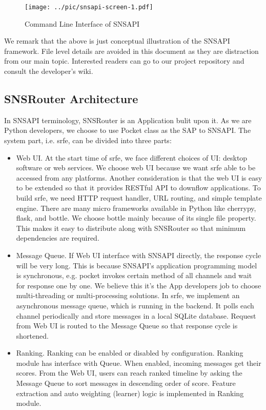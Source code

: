 \documentclass{sig-alternate}
\begin{document}
\begin{figure}[t!]
	\centering
	\texttt{[image: ../pic/snsapi-screen-1.pdf]}
	\caption{Command Line Interface of SNSAPI}
	\label{fig:snscli}
\end{figure}

We remark that the above is just conceptual illustration of the SNSAPI framework. 
File level details are avoided in this document as they are distraction from our main topic. 
Interested readers can go to our project repository \cite{github_snsapi} 
and consult the developer's wiki. 

\subsection{SNSRouter Architecture}
\label{sec:SNSRouter Architecture}

In SNSAPI terminology, SNSRouter is an Application bulit upon it. 
As we are Python developers, we choose to use Pocket class as the SAP to SNSAPI. 
The system part, i.e. \gls{srfe}, can be divided into three parts:
\begin{itemize}
	\item Web UI. 
		At the start time of \gls{srfe}, we face different choices of UI:
		desktop software or web services. 
		We choose web UI because we want \gls{srfe} able to be accessed from any platforms. 
		Another consideration is that the web UI is easy to be extended 
		so that it provides RESTful API to downflow applications. 
		To build \gls{srfe}, we need HTTP request handler, 
		URL routing, and simple template engine. 
		There are many micro frameworks available in Python like cherrypy, flask, and bottle. 
		We choose bottle mainly because of its single file property. 
		This makes it easy to distribute along with SNSRouter so that minimum dependencies are required. 
	\item Message Queue. 
		If Web UI interface with SNSAPI directly, the response cycle will be very long. 
		This is because SNSAPI's application programming model is synchronous, 
		e.g. pocket invokes certain method of all channels and wait for response one by one. 
		We believe this it's the App developers job to choose 
		multi-threading or multi-processing solutions. 
		In \gls{srfe}, we implement an asynchronous message queue, which is running in the backend. 
		It polls each channel periodically and store messages in a local SQLite database. 
		Request from Web UI is routed to the Message Queue so that response cycle is shortened. 
	\item Ranking. 
		Ranking can be enabled or disabled by configuration. 
		Ranking module has interface with Queue. 
		When enabled, incoming messages get their scores. 
		From the Web UI, users can reach ranked timeline by asking 
		the Message Queue to sort messages in descending order of score. 
		Feature extraction and auto weighting (learner) logic is implemented in Ranking module. 
\end{itemize}
\end{document}
